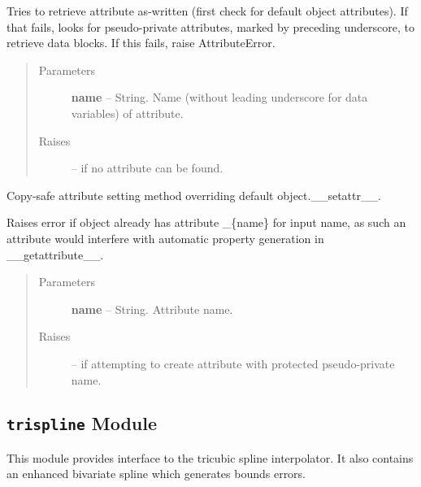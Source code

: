 \documentclass[letterpaper,10pt,english]{sphinxmanual}
\begin{document}
\begin{fulllineitems}
\begin{fulllineitems}
Tries to retrieve attribute as-written (first check for default object attributes).
If that fails, looks for pseudo-private attributes, marked by preceding underscore,
to retrieve data blocks.  If this fails, raise AttributeError.
\begin{quote}\begin{description}
\item[{Parameters }] \leavevmode
\textbf{name} --
String.
Name (without leading underscore for data variables) of attribute.

\item[{Raises }] \leavevmode
{} -- 
if no attribute can be found.

\end{description}\end{quote}

\end{fulllineitems}


\begin{fulllineitems}
\label{eqtools:eqtools.pfilereader.PFileReader.__setattr__}
Copy-safe attribute setting method overriding default object.\_\_setattr\_\_.

Raises error if object already has attribute \_\{name\} for input name,
as such an attribute would interfere with automatic property generation in
\_\_getattribute\_\_.
\begin{quote}\begin{description}
\item[{Parameters }] \leavevmode
\textbf{name} --
String.
Attribute name.

\item[{Raises }] \leavevmode
{} -- 
if attempting to create attribute with protected
pseudo-private name.

\end{description}\end{quote}

\end{fulllineitems}


\end{fulllineitems}



\subsection{\texttt{trispline} Module}
\label{eqtools:trispline-module}\label{eqtools:module-eqtools.trispline}
This module provides interface to the tricubic spline interpolator.  It also contains an enhanced bivariate spline which generates bounds errors.
\end{document}
